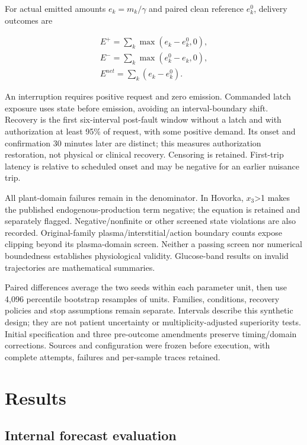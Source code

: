\documentclass[journal,10pt,letterpaper]{IEEEtran}
\begin{document}
For actual emitted amounts \(e_k=m_k/\gamma\) and paired clean reference
\(e_k^0\), delivery outcomes are

\[\begin{gathered}
E^+=\sum_k\max(e_k-e_k^0,0),\\
E^-=\sum_k\max(e_k^0-e_k,0),\\
E^{net}=\sum_k(e_k-e_k^0). 
\end{gathered}\tag{7}\]

An interruption requires positive request and zero emission. Commanded
latch exposure uses state before emission, avoiding an interval-boundary
shift. Recovery is the first six-interval post-fault window without a
latch and with authorization at least 95\% of request, with some
positive demand. Its onset and confirmation 30 minutes later are
distinct; this measures authorization restoration, not physical or
clinical recovery. Censoring is retained. First-trip latency is relative
to scheduled onset and may be negative for an earlier nuisance trip.

All plant-domain failures remain in the denominator. In Hovorka,
\(x_3\)\textgreater1 makes the published endogenous-production term
negative; the equation is retained and separately flagged.
Negative/nonfinite or other screened state violations are also recorded.
Original-family plasma/interstitial/action boundary counts expose
clipping beyond its plasma-domain screen. Neither a passing screen nor
numerical boundedness establishes physiological validity. Glucose-band
results on invalid trajectories are mathematical summaries.

Paired differences average the two seeds within each parameter unit,
then use 4,096 percentile bootstrap resamples of units. Families,
conditions, recovery policies and stop assumptions remain separate.
Intervals describe this synthetic design; they are not patient
uncertainty or multiplicity-adjusted superiority tests. Initial
specification and three pre-outcome amendments preserve timing/domain
corrections. Sources and configuration were frozen before execution,
with complete attempts, failures and per-sample traces retained.

\section{Results}

\subsection{Internal forecast evaluation}
\end{document}
